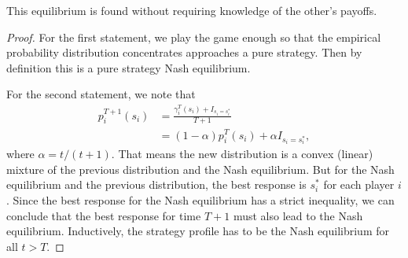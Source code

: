 This equilibrium is found without requiring knowledge of the other's payoffs.

\begin{proof}
    For the first statement, we play the game enough so that the empirical probability distribution concentrates approaches a pure strategy. Then by definition this is a pure strategy Nash equilibrium.

    For the second statement, 
    we note that \begin{align*}
    p_i^{T+1}(s_i)&=\frac{\gamma_i^T(s_i)+ I_{s_i=s_i^*}}{T+1}\\
    &= (1-\alpha)p_i^T(s_i)+\alpha I_{s_i=s_i^*},
    \end{align*}
    where $\alpha = t/(t+1)$.
    That means the new distribution is a convex (linear) mixture of the previous distribution and the Nash equilibrium.
    But for the Nash equilibrium and the previous distribution, the best response is $s_i^*$ for each player $i$. Since the best response for the Nash equilibrium has a strict inequality, we can conclude that the best response for time $T+1$ must also lead to the Nash equilibrium. Inductively, the strategy profile has to be the Nash equilibrium for all $t>T$.
\end{proof}


